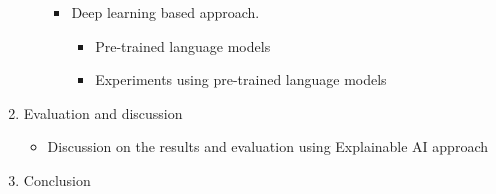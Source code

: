\begin{enumerate}
\begin{itemize}
\begin{itemize}
\begin{itemize}
                \end{itemize}
                \item Deep learning based approach. 
                 \begin{itemize}
                    \item Pre-trained language models
                    \item Experiments using pre-trained language models
                \end{itemize}
            \end{itemize}
        \end{itemize}
    \item Evaluation and discussion 
        \begin{itemize}
            \item Discussion on the results and evaluation using Explainable AI approach
        \end{itemize}
    \item Conclusion
\end{enumerate}